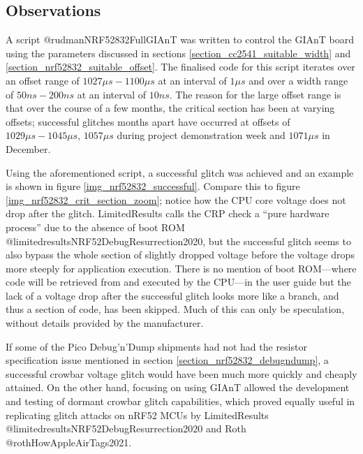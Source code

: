 \hypertarget{observations}{%
\subsection{\texorpdfstring{Observations\label{section_nrf52832_observations}}{Observations}}\label{observations}}

A script @rudmanNRF52832FullGIAnT was written to control the GIAnT board
using the parameters discussed in sections
\ref{section_cc2541_suitable_width} and
\ref{section_nrf52832_suitable_offset}. The finalised code for this
script iterates over an offset range of \(1027\mu s - 1100\mu s\) at an
interval of \(1\mu s\) and over a width range of \(50ns - 200ns\) at an
interval of \(10ns\). The reason for the large offset range is that over
the course of a few months, the critical section has been at varying
offsets; successful glitches months apart have occurred at offsets of
\(1029\mu s - 1045\mu s\), \(1057\mu s\) during project demonstration
week and \(1071\mu s\) in December.

Using the aforementioned script, a successful glitch was achieved and an
example is shown in figure \ref{img_nrf52832_successful}. Compare this
to figure \ref{img_nrf52832_crit_section_zoom}; notice how the CPU core
voltage does not drop after the glitch. LimitedResults calls the CRP
check a ``pure hardware process'' due to the absence of boot ROM
@limitedresultsNRF52DebugResurrection2020, but the successful glitch
seems to also bypass the whole section of slightly dropped voltage
before the voltage drops more steeply for application execution. There
is no mention of boot ROM---where code will be retrieved from and
executed by the CPU---in the user guide but the lack of a voltage drop
after the successful glitch looks more like a branch, and thus a section
of code, has been skipped. Much of this can only be speculation, without
details provided by the manufacturer.

If some of the Pico Debug'n'Dump shipments had not had the resistor
specification issue mentioned in section
\ref{section_nrf52832_debugndump}, a successful crowbar voltage glitch
would have been much more quickly and cheaply attained. On the other
hand, focusing on using GIAnT allowed the development and testing of
dormant crowbar glitch capabilities, which proved equally useful in
replicating glitch attacks on nRF52 MCUs by LimitedResults
@limitedresultsNRF52DebugResurrection2020 and Roth
@rothHowAppleAirTags2021.

